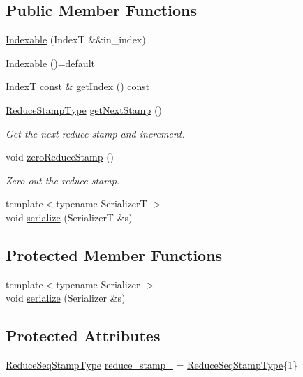 \subsection*{Public Member Functions}
\begin{DoxyCompactItemize}
\item 
\hyperlink{structvt_1_1vrt_1_1collection_1_1_indexable_ad3f327a35771a31ec63241b9be57569c}{Indexable} (IndexT \&\&in\+\_\+index)
\item 
\hyperlink{structvt_1_1vrt_1_1collection_1_1_indexable_a6390131bf531b7128367c51c788305c2}{Indexable} ()=default
\item 
IndexT const  \& \hyperlink{structvt_1_1vrt_1_1collection_1_1_indexable_a28d05f23e7a20e12e94b8235305c1e82}{get\+Index} () const
\item 
\hyperlink{structvt_1_1vrt_1_1collection_1_1_indexable_a0369a8abcf13550caec736365f7fb30f}{Reduce\+Stamp\+Type} \hyperlink{structvt_1_1vrt_1_1collection_1_1_indexable_ac85630baeeee8fa34289eea08f6743af}{get\+Next\+Stamp} ()
\begin{DoxyCompactList}\small\item\em Get the next reduce stamp and increment. \end{DoxyCompactList}\item 
void \hyperlink{structvt_1_1vrt_1_1collection_1_1_indexable_a6779bdff2e752f84eee31eee51858f56}{zero\+Reduce\+Stamp} ()
\begin{DoxyCompactList}\small\item\em Zero out the reduce stamp. \end{DoxyCompactList}\item 
{\footnotesize template$<$typename SerializerT $>$ }\\void \hyperlink{structvt_1_1vrt_1_1collection_1_1_indexable_adadd30272517d10e6124a65edc48fb65}{serialize} (SerializerT \&s)
\end{DoxyCompactItemize}
\subsection*{Protected Member Functions}
\begin{DoxyCompactItemize}
\item 
{\footnotesize template$<$typename Serializer $>$ }\\void \hyperlink{structvt_1_1vrt_1_1collection_1_1_indexable_a6c95be93183665a0d03c149207f000f9}{serialize} (Serializer \&s)
\end{DoxyCompactItemize}
\subsection*{Protected Attributes}
\begin{DoxyCompactItemize}
\item 
\hyperlink{structvt_1_1vrt_1_1collection_1_1_indexable_af259d608ccabcbe13680763fe5f1c656}{Reduce\+Seq\+Stamp\+Type} \hyperlink{structvt_1_1vrt_1_1collection_1_1_indexable_a43424bdf00b61b9c0d4d05ee693d31f2}{reduce\+\_\+stamp\+\_\+} = \hyperlink{structvt_1_1vrt_1_1collection_1_1_indexable_af259d608ccabcbe13680763fe5f1c656}{Reduce\+Seq\+Stamp\+Type}\{1\}
\end{DoxyCompactItemize}

